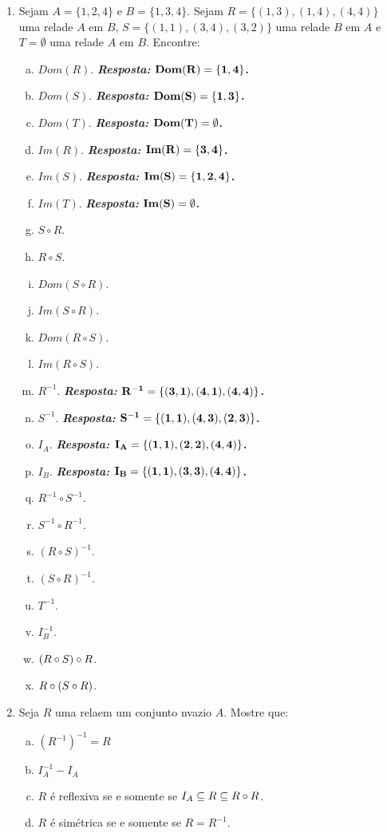 \begin{enumerate}[{\bf 1.}]

\item Sejam $A=\{1,2,4\}$ e $B=\{1,3,4\}$. Sejam $R=\{(1,3),(1,4),(4,4)\}$ uma rela\cao de $A$ em $B$, $S=\{(1,1),(3,4),(3,2)\}$ uma rela\cao de $B$ em $A$ e $T=\emptyset$ uma rela\cao de $A$ em $B$. Encontre:
\begin{enumerate}[a)]
\item $Dom(R)$. {\bf{\it Resposta:} ${\bf Dom(R)=\{1,4\}}$.}
\item $Dom(S)$. {\bf{\it Resposta:} ${\bf Dom(S)=\{1,3\}}$.}
\item $Dom(T)$. {\bf{\it Resposta:} ${\bf Dom(T)=\emptyset}$.}
\item $Im(R)$. {\bf{\it Resposta:} ${\bf Im(R)=\{3,4\}}$.}
\item $Im(S)$. {\bf{\it Resposta:} ${\bf Im(S)=\{1,2,4\}}$.}
\item $Im(T)$. {\bf{\it Resposta:} ${\bf Im(S)=\emptyset}$.}
\item $S\circ R$.
\item $R\circ S$.
\item $Dom(S\circ R)$.
\item $Im(S\circ R)$.
\item $Dom(R\circ S)$.
\item $Im(R\circ S)$.
\item $R^{-1}$. {\bf{\it Resposta:} ${\bf R^{-1}=\{(3,1),(4,1),(4,4)\}}$.}
\item $S^{-1}$. {\bf{\it Resposta:} ${\bf S^{-1}=\{(1,1),(4,3),(2,3)\}}$.}
\item $I_A$. {\bf{\it Resposta:} ${\bf I_A=\{(1,1),(2,2),(4,4)\}}$.}
\item $I_B$. {\bf{\it Resposta:} ${\bf I_B=\{(1,1),(3,3),(4,4)\}}$.}
\item $R^{-1}\circ S^{-1}$.
\item $S^{-1}\circ R^{-1}$.
\item $(R\circ S)^{-1}$.
\item $(S\circ R)^{-1}$.
\item $T^{-1}$.
\item $I_B^{-1}$.
\item $(R\circ S)\circ R$.
\item $R\circ(S\circ R)$. 
\end{enumerate}

\item Seja $R$ uma rela\cao em um conjunto n\ao vazio $A$. Mostre que:
\begin{enumerate}[a)]
\item $(R^{-1})^{-1}=R$
\item $I_A^{-1}-I_A$
\item $R$ \'e reflexiva se e somente se $I_A\subseteq R\subseteq R\circ R$.
\item $R$ \'e sim\'etrica se e somente se $R=R^{-1}$. 


\end{enumerate}
\end{enumerate}
